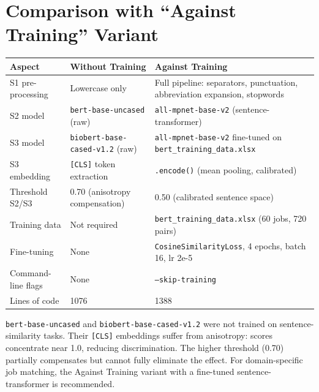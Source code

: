 ﻿\documentclass[12pt,a4paper]{article}
\begin{document}
\clearpage
\section{Comparison with ``Against Training'' Variant}

\begin{longtable}{@{}P{4cm}P{5.5cm}P{5.5cm}@{}}
\toprule
\textbf{Aspect} & \textbf{Without Training} & \textbf{Against Training} \\
\midrule
\endhead
S1 pre-processing &
  Lowercase only &
  Full pipeline: separators, punctuation, abbreviation expansion, stopwords \\
S2 model &
  \texttt{bert-base-uncased} (raw) &
  \texttt{all-mpnet-base-v2} (sentence-transformer) \\
S3 model &
  \texttt{biobert-base-cased-v1.2} (raw) &
  \texttt{all-mpnet-base-v2} fine-tuned on \texttt{bert\_training\_data.xlsx} \\
S3 embedding &
  \texttt{[CLS]} token extraction &
  \texttt{.encode()} (mean pooling, calibrated) \\
Threshold S2/S3 &
  0.70 (anisotropy compensation) &
  0.50 (calibrated sentence space) \\
Training data &
  Not required &
  \texttt{bert\_training\_data.xlsx} (60 jobs, 720 pairs) \\
Fine-tuning &
  None &
  \texttt{CosineSimilarityLoss}, 4 epochs, batch 16, lr 2e-5 \\
Command-line flags &
  None &
  \texttt{--skip-training} \\
Lines of code &
  1076 &
  1388 \\
\bottomrule
\end{longtable}

\begin{tcolorbox}[colback=warnred!40, colframe=red!60!black,
                  title=Warning: BERT raw embeddings are not calibrated for sentence similarity]
\texttt{bert-base-uncased} and \texttt{biobert-base-cased-v1.2} were not trained on sentence-similarity tasks. Their \texttt{[CLS]} embeddings suffer from anisotropy: scores concentrate near 1.0, reducing discrimination. The higher threshold (0.70) partially compensates but cannot fully eliminate the effect. For domain-specific job matching, the Against Training variant with a fine-tuned sentence-transformer is recommended.
\end{tcolorbox}
\end{document}
